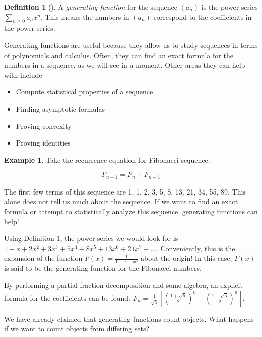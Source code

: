 \documentclass[11pt]{amsart}
\theoremstyle{plain}%
\theoremstyle{definition}
\newtheorem{defin}[thm]{{Definition}}
\newtheorem{ex}[thm]{Example}
\theoremstyle{remark}
\numberwithin{equation}{thm}
\begin{document}
\begin{defin}[\cite{Wilf}]
\label{genfundef}
A \textit{generating function} for the sequence $(a_n)$ is the power series $\sum_{n \geq 0} a_nx^n$. This means the numbers in $(a_n)$ correspond to the coefficients in the power series.
\end{defin}

Generating functions are useful because they allow us to study sequences in terms of polynomials and calculus. Often, they can find an exact formula for the numbers in a sequence, as we will see in a moment. Other areas they can help with include

\begin{itemize}
    \item Compute statistical properties of a sequence
    \item Finding asymptotic formulas
    \item Proving convexity
    \item Proving identities
\end{itemize}

\begin{ex}
Take the recurrence equation for Fibonacci sequence.

$$ F_{n+1} = F_n + F_{n-1}$$

The first few terms of this sequence are 1, 1, 2, 3, 5, 8, 13, 21, 34, 55, 89. This alone does not tell us much about the sequence. If we want to find an exact formula or attempt to statistically analyze this sequence, generating functions can help!

Using Definition \ref{genfundef}, the power series we would look for is $1 + x + 2x^2 + 3x^3 + 5x^4 + 8x^5 + 13x^6 + 21x^7 + ...$. Conveniently, this is the expansion of the function $F(x) = \frac{1}{1-x-x^2}$ about the origin! In this case, $F(x)$ is said to be the generating function for the Fibonacci numbers.

By performing a partial fraction decomposition and some algebra, an explicit formula for the coefficients can be found: $F_n = \frac{1}{\sqrt{5}}\left[\left(\frac{1+\sqrt{5}}{2}\right)^{n} -\left(\frac{1-\sqrt{5}}{2}\right)^{n}\right]$.

\end{ex}

We have already claimed that generating functions count objects. What happens if we want to count objects from differing sets?
\end{document}
